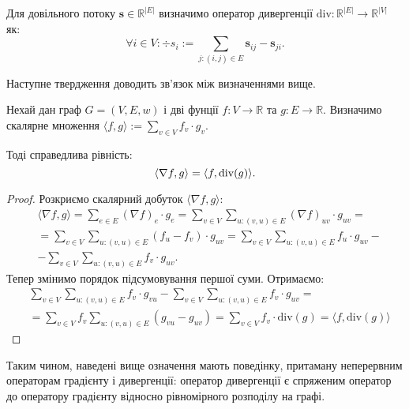 \begin{definition}
    \label{def:div}
    Для довільного потоку $\mathbf s \in \mathbb{R}^{|E|}$ визначимо оператор дивергенції
    $\text{div} : \mathbb{R}^{|E|} \to \mathbb{R}^{|V|}$ як:
    $$
        \forall i \in V : \div{s}_i := \sum_{j: (i, j) \in E} \mathbf{s}_{ij} - \mathbf{s}_{ji}.
    $$
\end{definition}

Наступне твердження доводить зв'язок між визначеннями вище.

\begin{claim}
    Нехай дан граф $G = (V, E, w)$ і дві фунції $f : V \to \mathbb{R}$ та $g : E \to \mathbb{R}$.
    Визначимо скалярне множення $\langle f, g \rangle := \sum_{v \in V} f_v \cdot g_v$.

    Тоді справедлива рівність:
    \begin{equation*}
        \langle \nabla f, g \rangle = \langle f, \textnormal{div}(g) \rangle.
    \end{equation*}
\end{claim}
\begin{proof}
    Розкриємо скалярний добуток $\langle \nabla f, g \rangle$:
    \begin{align*}
        &\langle \nabla f, g \rangle = \sum_{e \in E} (\nabla f)_e \cdot g_e =
        \sum_{v \in V} \sum_{u : (v, u) \in E} (\nabla f)_{uv} \cdot g_{uv} = \\
        &=\sum_{v \in V} \sum_{u : (v, u) \in E} (f_u - f_v) \cdot g_{uv} =
        \sum_{v \in V} \sum_{u : (v, u) \in E} f_u \cdot g_{uv} - \\
        &-\sum_{v \in V} \sum_{u : (v, u) \in E} f_v \cdot g_{uv}.
    \end{align*}
    Тепер змінимо порядок підсумовування першої суми. Отримаємо:
    \begin{align*}
        &\sum_{v \in V} \sum_{u : (v, u) \in E} f_v \cdot g_{vu} - \sum_{v \in V} \sum_{u : (v, u) \in E} f_v \cdot g_{uv} = \\
        &= \sum_{v \in V} f_v \sum_{u : (v, u) \in E} (g_{vu} - g_{uv}) =
        \sum_{v \in V} f_v \cdot \text{div}(g) = \langle f, \text{div}(g) \rangle
    \end{align*}
\end{proof}

Таким чином, наведені вище означення мають поведінку, 
притаману неперервним операторам градієнту і дивергенції: оператор дивергенції є спряженим оператор до оператору градієнту
відносно рівномірного розподілу на графі.

